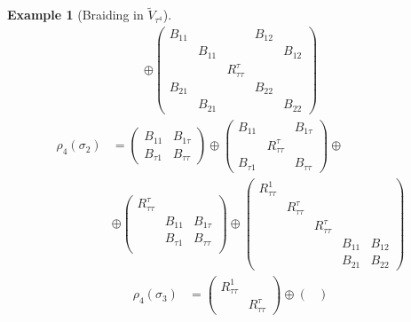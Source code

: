 \documentclass[a4paper,10pt,oneside]{book}
\theoremstyle{plain}
\theoremstyle{definition}
\newtheorem{example}{Example}[section]
\theoremstyle{remark}
\begin{document}
\begin{example}[Braiding in $\widetilde{V}_{τ^4}$]
\begin{equation}
\begin{aligned}
      \oplus
      \begin{pmatrix}
        B_{11} &        &          & B_{12} & \\
               & B_{11} &          &        & B_{12} \\
               &        & R_{ττ}^τ \\
        B_{21} &        &          & B_{22} & \\
               & B_{21} &          &        & B_{22}
      \end{pmatrix}
    \end{aligned}
  \end{equation}
  \begin{equation}
    \begin{aligned}
      ρ_4(σ_2) &=
      \begin{pmatrix}
        B_{11} & B_{1τ} \\
        B_{τ1} & B_{ττ}
      \end{pmatrix}
      \oplus
      \begin{pmatrix}
        B_{11} & & B_{1τ} \\
        & R_{ττ}^τ \\
        B_{τ1} & & B_{ττ}
      \end{pmatrix}
      \oplus \\
      & \oplus
      \begin{pmatrix}
        R_{ττ}^τ \\
        & B_{11} & B_{1τ} \\
        & B_{τ1} & B_{ττ} \\
      \end{pmatrix}
      \oplus
      \begin{pmatrix}
        R_{ττ}^1 \\
        & R_{ττ}^τ \\
        & & R_{ττ}^τ \\
        & & & B_{11} & B_{12} \\
        & & & B_{21} & B_{22}
      \end{pmatrix}
    \end{aligned}
  \end{equation}
  \begin{equation}
    \begin{aligned}
      ρ_4(σ_3) &=
      \begin{pmatrix}
        R_{ττ}^1 \\
        & R_{ττ}^τ
      \end{pmatrix}
      \oplus
      \begin{pmatrix}

\end{pmatrix}
\end{aligned}
\end{equation}
\end{example}
\end{document}
